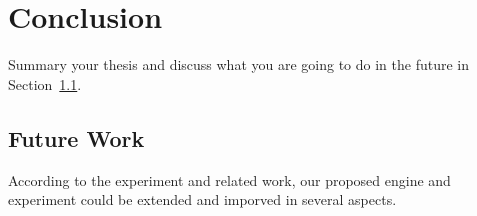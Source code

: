 \chapter{Conclusion}
\label{cha:conc}
Summary your thesis and discuss what you are going to do in the future in Section~\ref{sec:future}.


\section{Future Work}
\label{sec:future}
According to the experiment and related work, our proposed engine and experiment could be extended and imporved in several aspects. 




